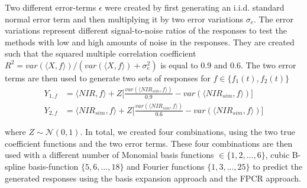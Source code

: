 \documentclass[11pt,twoside,a4paper]{article}
\begin{document}
		 Two different error-terms $\epsilon$ were created by first generating an i.i.d. standard normal error term and then multiplying it by two error variations $\sigma_e $. The error variations represent different signal-to-noise ratios of the responses to test the methods with low and high amounts of noise in the responses. They are created such that the squared multiple correlation coefficient $R^2 = var(\langle X, f\rangle) / (var(\langle X, f\rangle) + \sigma^2_{e})$ is equal to 0.9 and 0.6. The two error terms are then used to generate two sets of responses for $f \in \{f_1(t), f_2(t)\}$	
		\begin{equation}
			\begin{split}
				Y_{1,f} & = \langle NIR, f\rangle + Z  \biggl\lbrack\frac{var(\langle NIR_{sim}, f\rangle)}{0.9} - var(\langle NIR_{sim}, f\rangle)\biggr\rbrack \\
				Y_{2,f} & = \langle NIR_{sim}, f\rangle + Z  \biggl\lbrack\frac{var(\langle NIR_{sim}, f\rangle)}{0.6} - var(\langle NIR_{sim}, f\rangle)\biggr\rbrack
			\end{split}
		\end{equation}
		
		where $Z \sim \mathcal{N}(0,1)$. In total, we created four combinations, using the two true coefficient functions and the two error terms. These four combinations are then used with a different number of Monomial basis functions $ \in \{1,2, \dots, 6\}$, cubic B-spline basis-function $\{5,6,...,18\}$ and Fourier functions $\{1,3,...,25\}$ to predict the generated responses using the basis expansion approach and the FPCR approach.\\
\end{document}
